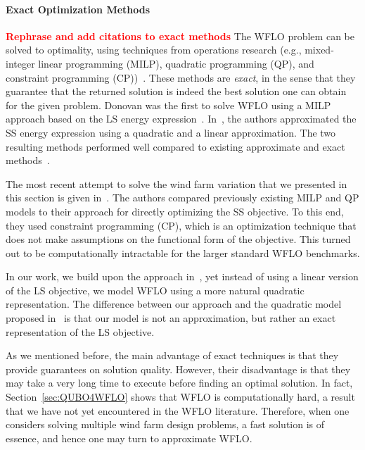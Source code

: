 \documentclass[preprint,12pt]{elsarticle}
\newcommand{\todo}[1]{{\textcolor{red}{\bf {#1}}}}
\begin{document}
\paragraph{Exact Optimization Methods} 
\todo{Rephrase and add citations to exact methods}
The WFLO problem can be solved  
to optimality, using
techniques from operations research (e.g., mixed-integer linear programming (MILP), quadratic programming (QP), and constraint programming (CP))~\cite{}.
These methods are \emph{exact}, in the sense that they guarantee that the returned solution is indeed
the best solution one can obtain for the given problem. Donovan was the first to solve WFLO using a
MILP approach based on the LS energy expression~\cite{donovan2005wind}. In~\cite{turner2014new}, the authors
approximated the SS energy expression using a quadratic and a linear approximation. The two resulting methods performed well
compared to existing approximate and exact methods~\cite{turner2014new}. 

The most recent attempt to solve the wind farm variation that we presented 
in this section is given in~\cite{Zhang2014}. The authors compared
previously existing MILP and QP models to their approach for directly optimizing the SS objective. To this end, they used constraint programming (CP), which 
is an optimization technique that does not make assumptions on the functional form of the objective.
This turned out to be computationally intractable for the larger standard WFLO benchmarks. 

In our work, we build upon the approach in~\cite{donovan2005wind}, yet instead of using a linear version of the LS objective, we 
model WFLO using a more natural quadratic representation. The difference between our approach and the quadratic model
proposed in~\cite{turner2014new} is that our model is not an approximation, but rather an exact representation of the LS objective.

As we mentioned before, the main advantage of exact techniques
is that they provide guarantees on solution quality. However, their disadvantage is
that they may take a very long time to execute before finding an optimal solution. 
In fact, Section~\ref{sec:QUBO4WFLO} shows that WFLO is computationally hard, a result
that we have not yet encountered in the WFLO literature. Therefore,
when one considers solving multiple wind farm design problems, a fast solution is of essence,
and hence one may turn to approximate WFLO.
\end{document}
